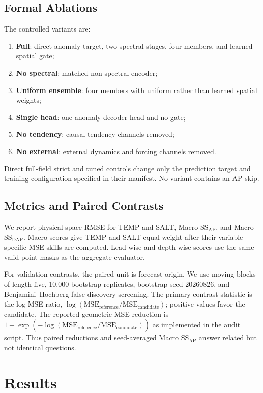 \documentclass[conference]{IEEEtran}
\begin{document}
\subsection{Formal Ablations}
The controlled variants are:
\begin{enumerate}
    \item \textbf{Full}: direct anomaly target, two spectral stages, four members, and learned spatial gate;
    \item \textbf{No spectral}: matched non-spectral encoder;
    \item \textbf{Uniform ensemble}: four members with uniform rather than learned spatial weights;
    \item \textbf{Single head}: one anomaly decoder head and no gate;
    \item \textbf{No tendency}: causal tendency channels removed;
    \item \textbf{No external}: external dynamics and forcing channels removed.
\end{enumerate}
Direct full-field strict and tuned controls change only the prediction target and training configuration specified in their manifest. No variant contains an AP skip.

\subsection{Metrics and Paired Contrasts}
We report physical-space RMSE for TEMP and SALT, Macro $\mathrm{SS}_{\mathrm{AP}}$, and Macro $\mathrm{SS}_{\mathrm{DAP}}$. Macro scores give TEMP and SALT equal weight after their variable-specific MSE skills are computed. Lead-wise and depth-wise scores use the same valid-point masks as the aggregate evaluator.

For validation contrasts, the paired unit is forecast origin. We use moving blocks of length five, 10,000 bootstrap replicates, bootstrap seed 20260826, and Benjamini--Hochberg false-discovery screening. The primary contrast statistic is the log MSE ratio, $\log(\mathrm{MSE}_{\mathrm{reference}}/\mathrm{MSE}_{\mathrm{candidate}})$; positive values favor the candidate. The reported geometric MSE reduction is $1-\exp(-\overline{\log(\mathrm{MSE}_{\mathrm{reference}}/\mathrm{MSE}_{\mathrm{candidate}})})$ as implemented in the audit script. Thus paired reductions and seed-averaged Macro $\mathrm{SS}_{\mathrm{AP}}$ answer related but not identical questions.

\FloatBarrier
\section{Results}
\end{document}
